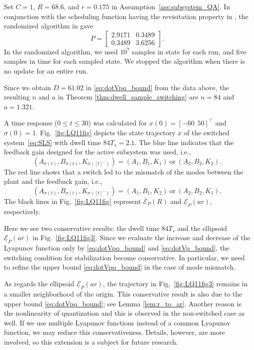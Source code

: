\documentclass[a4, 11pt]{article}
\begin{document}
Set $C = 1$, $R=68.6$, and $r=0.175$ in Assumption~\ref{ass:subsystem_QA}.
In conjunction with 
the scheduling function having the revisitation property in \cite{Liberzon2004},
the randomized algorithm in \cite{Ishii2004} gave
\begin{equation*}
P = 
\begin{bmatrix}
2.9171 & 0.3489 \\ 
0.3489 & 3.6256
\end{bmatrix}.
\end{equation*}
In the randomized algorithm, 
we used $10^7$ samples in state for each run,
and five samples in time for each sampled state.
We stopped the algorithm when there is no update for an entire run.

Since we obtain $D = 61.02$ in \eqref{eq:dotVpq_bound} from the data above,
the resulting $n$ and $a$ in Theorem \ref{thm:dwell_sample_switching} are
$n=84$ and $a=1.321$.

A time response ($0 \leq t \leq 30$) was calculated for $x(0) = [-60~~50]^{\top}$ and 
$\sigma(0)=1$.
Fig.~\ref{fig:LQ11fig} depicts the state trajectory $x$ 
of the switched system~\eqref{eq:SLS} with dwell time $84T_s = 2.1$.
The blue line indicates that the feedback gain designed for the active subsystem
was used, i.e.,
\begin{equation*}
(A_{\sigma(t)},B_{\sigma(t)},K_{\sigma([t]^-)})
=
(A_{1},B_{1},K_{1})
~\text{or}~
(A_{2},B_{2},K_{2}).
\end{equation*}
The red line shows that a switch led to the mismatch of the modes between
the plant and the feedback gain, i.e.,
\begin{equation*}
(A_{\sigma(t)},B_{\sigma(t)},K_{\sigma([t]^-)})
=
(A_{1},B_{1},K_{2})
~\text{or}~
(A_{2},B_{2},K_{1}).
\end{equation*}
The black lines in Fig.~\ref{fig:LQ11fig}
represent $\overline{\mathcal{E}}_P(R)$ and
$\underline{\mathcal{E}}_P(ar)$, respectively.

Here we see two conservative results: the dwell time $84T_s$
and the ellipsoid $\underline{\mathcal{E}}_P(ar)$ in Fig.~\ref{fig:LQ11fig3}.
Since we evaluate the increase and decrease of the Lyapunov function 
only by \eqref{eq:dotVpq_bound} and \eqref{eq:dotVp_bound},
the switching condition for stabilization become conservative.
In particular, we need to refine the upper bound \eqref{eq:dotVpq_bound}
in the case of mode mismatch.

As regards the ellipsoid $\underline{\mathcal{E}}_P(ar)$,
the trajectory in Fig.~\ref{fig:LQ11fig3} remains in
a smaller neighborhood of the origin. 
This conservative result is also due to 
the upper bound \eqref{eq:dotVpq_bound}; see Lemma \ref{lem:r_to_ar}.
Another reason is 
the nonlinearity of quantization
and this is observed in the non-switched case \cite{Ishii2004} as well.
If we use multiple Lyapunov functions instead
of a common Lyapunov function, we may reduce this conservativeness.
Details, however, are more involved, so this extension is a subject for future research.
\end{document}
